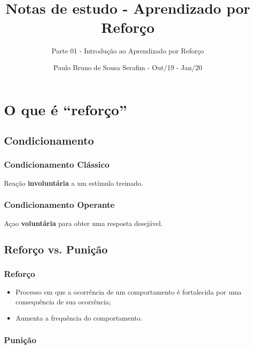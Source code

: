\documentclass{article}
\title{Notas de estudo - Aprendizado por Reforço}
\author{Parte 01 - Introdução ao Aprendizado por Reforço}
\date{Paulo Bruno de Sousa Serafim - Out/19 - Jan/20}
\begin{document}
\maketitle

    \section{O que é ``reforço''}
    
        \subsection{Condicionamento}
        
            \subsubsection{Condicionamento Clássico}
            
                Reação \textbf{involuntária} a um estímulo treinado.
            
            \subsubsection{Condicionamento Operante}
            
                Açao \textbf{voluntária} para obter uma resposta desejável.
            
        \subsection{Reforço vs. Punição}
        
            \subsubsection{Reforço}
            
                \begin{itemize}
                    \item Processo em que a ocorrência de um comportamento é fortalecida por uma consequência de sua ocorrência;
                    \item Aumenta a frequência do comportamento.
                \end{itemize}
            
            \subsubsection{Punição}
            
\end{document}
